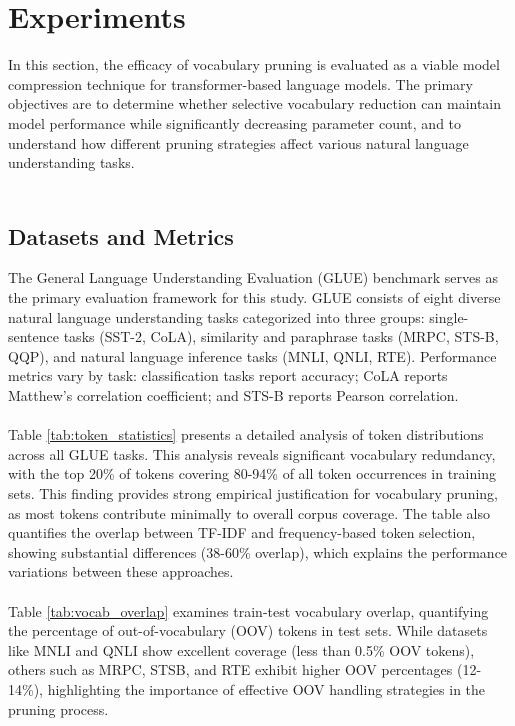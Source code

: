 \documentclass[twocolumn]{article}
\begin{document}
\section{Experiments}
In this section, the efficacy of vocabulary pruning is evaluated as a viable model compression technique for transformer-based language models. The primary objectives are to determine whether selective vocabulary reduction can maintain model performance while significantly decreasing parameter count, and to understand how different pruning strategies affect various natural language understanding tasks. 
\\ \\
\subsection{Datasets and Metrics}
The General Language Understanding Evaluation (GLUE) benchmark serves as the primary evaluation framework for this study. GLUE consists of eight diverse natural language understanding tasks categorized into three groups: single-sentence tasks (SST-2, CoLA), similarity and paraphrase tasks (MRPC, STS-B, QQP), and natural language inference tasks (MNLI, QNLI, RTE). Performance metrics vary by task: classification tasks report accuracy; CoLA reports Matthew's correlation coefficient; and STS-B reports Pearson correlation.
\\ \\
Table \ref{tab:token_statistics} presents a detailed analysis of token distributions across all GLUE tasks. This analysis reveals significant vocabulary redundancy, with the top 20\% of tokens covering 80-94\% of all token occurrences in training sets. This finding provides strong empirical justification for vocabulary pruning, as most tokens contribute minimally to overall corpus coverage. The table also quantifies the overlap between TF-IDF and frequency-based token selection, showing substantial differences (38-60\% overlap), which explains the performance variations between these approaches.
\\ \\
Table \ref{tab:vocab_overlap} examines train-test vocabulary overlap, quantifying the percentage of out-of-vocabulary (OOV) tokens in test sets. While datasets like MNLI and QNLI show excellent coverage (less than 0.5\% OOV tokens), others such as MRPC, STSB, and RTE exhibit higher OOV percentages (12-14\%), highlighting the importance of effective OOV handling strategies in the pruning process. 
\\ \\
\end{document}
